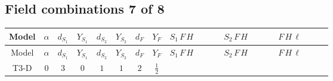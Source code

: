 \documentclass[8pt]{article}
\begin{document}
\begin{landscape}
\subsection*{Field combinations 7 of 8}
\begin{longtable}{@{}cccccccc >{\raggedright\arraybackslash}p{0.21\linewidth} >{\raggedright\arraybackslash}p{0.21\linewidth} >{\raggedright\arraybackslash}p{0.21\linewidth}@{}}
\toprule
Model & $\alpha$ & $d_{S_1}$ & $Y_{S_1}$ & $d_{S_2}$ & $Y_{S_2}$ & $d_F$ & $Y_F$ & $S_1\,F\,H$ & $S_2\,F\,H$ & $F\,H\,\ell$ \\
\midrule
\endfirsthead
\toprule
Model & $\alpha$ & $d_{S_1}$ & $Y_{S_1}$ & $d_{S_2}$ & $Y_{S_2}$ & $d_F$ & $Y_F$ & $S_1\,F\,H$ & $S_2\,F\,H$ & $F\,H\,\ell$ \\
\midrule
\endhead
T3-D & $0$ & $3$ & $0$ & $1$ & $1$ & $2$ & $\frac{1}{2}$ & \scriptsize\adjustbox{max width=\linewidth}{$\begin{gathered} -\frac{2 \hbar  \log \left(\frac{\bar{\mu}^{2}}{M_F^2}\right) \overline{y_{1,i_1,r_1}} \overline{Y_{e,i_2,i_3}} H_{a_1} S_{1,j_1} y_{1,i_2,r_1} Y_{e,i_1,i_3} H_{a_1}{}^{\dagger } S_{1,j_1}{}^{\dagger }}{\sqrt{3}} \\ +2 i \sqrt{\frac{2}{3}} \hbar  \log \left(\frac{\bar{\mu}^{2}}{M_F^2}\right) \overline{y_{1,i_1,r_1}} \overline{Y_{e,i_2,i_3}} H_{a_2} S_{1,j_2} y_{1,i_2,r_1} Y_{e,i_1,i_3} H_{a_1}{}^{\dagger } S_{1,j_1}{}^{\dagger } \mathcal{I}_{H1,a_1,a_2,j_1,j_2}{}^1 \\ -\frac{2 \hbar  \log \left(\frac{\bar{\mu}^{2}}{M_F^2}\right) \overline{y_{1,i_1,r_1}} H_{a_2} S_{1,j_2} y_{1,i_1,r_1} H_{a_1}{}^{\dagger } S_{1,j_1}{}^{\dagger } \mathcal{I}_{H1,a_1,a_2,j_1,j_2}{}^2 \lambda_{HS_1}^{(1)}^{(2)}}{\sqrt{3}}\end{gathered}$} & \scriptsize\adjustbox{max width=\linewidth}{$\begin{gathered} -2 \hbar  \log \left(\frac{\bar{\mu}^{2}}{M_F^2}\right) \overline{y_{2,i_1,r_1}} \overline{Y_{e,i_2,i_3}} H_{a_1} S_2 y_{2,i_2,r_1} Y_{e,i_1,i_3} H_{a_1}{}^{\dagger } S_2{}^{\dagger } \\ -2 \hbar  \log \left(\frac{\bar{\mu}^{2}}{M_F^2}\right) \overline{y_{2,i_1,r_1}} H_{a_2} S_2 y_{2,i_1,r_1} H_{a_1}{}^{\dagger } S_2{}^{\dagger } \mathcal{I}_{H2,a_1,a_2}{}^1 \lambda_{HS_2}^{(1)}^{(1)}\end{gathered}$} & \scriptsize\adjustbox{max width=\linewidth}{$\begin{gathered} +\frac{2 \hbar  \log \left(\frac{\bar{\mu}^{2}}{M_F^2}\right) \overline{y_{1,i_1,r_1}} \overline{y_{2,i_2,r_1}} L_{a_4,i_2}{}^T\, C\, P_L\, L_{a_2,i_1} H_{a_1} H_{a_3} \lambda_5 \epsilon_{a_1,a_2} \epsilon_{a_3,a_4}}{\sqrt{3} M_F} \\ +\frac{2 \hbar  \log \left(\frac{\bar{\mu}^{2}}{M_F^2}\right) \overline{\lambda_5} \overline{L_{a_3,i_1}}\, C\, P_R\, \overline{L_{a_4,i_2}}{}^T y_{1,i_1,r_1} y_{2,i_2,r_1} \epsilon_{a_1,a_3} \epsilon_{a_2,a_4} H_{a_1}{}^{\dagger } H_{a_2}{}^{\dagger }}{\sqrt{3} M_F}\end{gathered}$} \\
\midrule
\bottomrule
\end{longtable}
\clearpage

\end{landscape}
\end{document}

